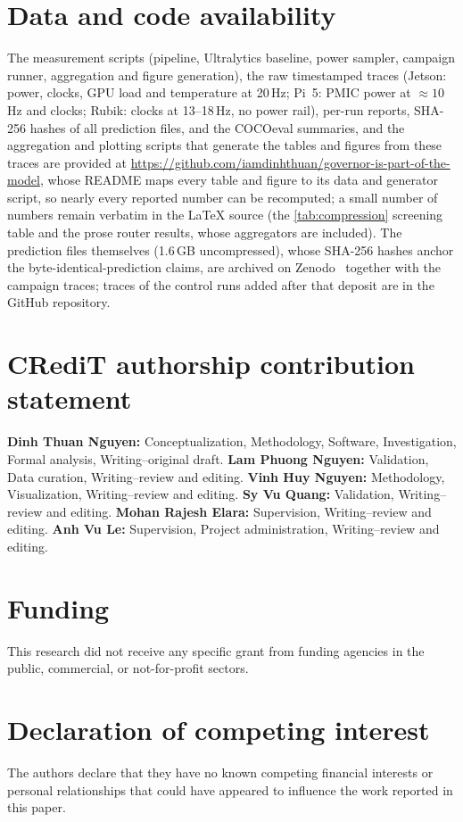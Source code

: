 \section*{Data and code availability}
\label{sec:data}
The measurement scripts (pipeline, Ultralytics baseline, power sampler,
campaign runner, aggregation and figure generation), the raw timestamped
traces (Jetson: power, clocks, GPU load and temperature at 20\,Hz;
Pi~5: PMIC power at ${\approx}10$\,Hz and clocks; Rubik: clocks at
13--18\,Hz, no power rail), per-run reports, SHA-256 hashes of all
prediction files, and the COCOeval summaries, and the aggregation and plotting scripts that
generate the tables and figures from these traces are provided at
\url{https://github.com/iamdinhthuan/governor-is-part-of-the-model},
whose README maps every table and figure to its data and generator
script, so nearly every reported number can be recomputed; a small
number of numbers remain verbatim in the LaTeX source (the
\cref{tab:compression} screening table and the prose router results,
whose aggregators are included). The prediction files themselves
(1.6\,GB uncompressed), whose SHA-256 hashes anchor the
byte-identical-prediction claims, are archived on
Zenodo~\cite{nguyen2026dataset} together with the campaign traces;
traces of the control runs added after that deposit are in the GitHub
repository.

\section*{CRediT authorship contribution statement}
\textbf{Dinh Thuan Nguyen:} Conceptualization, Methodology, Software,
Investigation, Formal analysis, Writing--original draft.
\textbf{Lam Phuong Nguyen:} Validation, Data curation, Writing--review
and editing.
\textbf{Vinh Huy Nguyen:} Methodology, Visualization, Writing--review
and editing.
\textbf{Sy Vu Quang:} Validation, Writing--review and editing.
\textbf{Mohan Rajesh Elara:} Supervision, Writing--review and editing.
\textbf{Anh Vu Le:} Supervision, Project administration,
Writing--review and editing.

\section*{Funding}
This research did not receive any specific grant from funding agencies
in the public, commercial, or not-for-profit sectors.

\section*{Declaration of competing interest}
The authors declare that they have no known competing financial
interests or personal relationships that could have appeared to
influence the work reported in this paper.

